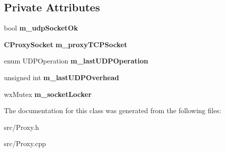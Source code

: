 \subsection*{Private Attributes}
\begin{DoxyCompactItemize}
\item 
bool {\bfseries m\_\-udpSocketOk}\label{classCDatagramSocketProxy_a014fa03e74e0f87898c461fbcc0de639}

\item 
{\bf CProxySocket} {\bfseries m\_\-proxyTCPSocket}\label{classCDatagramSocketProxy_afb7bd27b72280a7a9f7b51b6a1afb1ca}

\item 
enum UDPOperation {\bfseries m\_\-lastUDPOperation}\label{classCDatagramSocketProxy_a81b4acd7adef278c2f77dcc4a8de972f}

\item 
unsigned int {\bfseries m\_\-lastUDPOverhead}\label{classCDatagramSocketProxy_aebb1c97cd952c40a608cec464e6443d1}

\item 
wxMutex {\bfseries m\_\-socketLocker}\label{classCDatagramSocketProxy_a9bc5fede976d08138b293e1c890ab6e3}

\end{DoxyCompactItemize}


The documentation for this class was generated from the following files:\begin{DoxyCompactItemize}
\item 
src/Proxy.h\item 
src/Proxy.cpp\end{DoxyCompactItemize}
